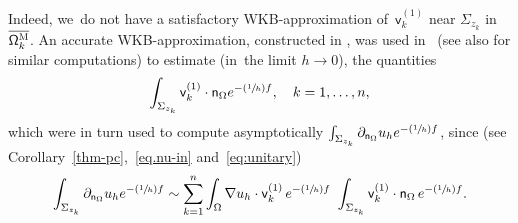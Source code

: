 \documentclass[10pt]{amsart}
\newcommand{\Psfrac}[2]{(\sfrac{#1}{#2})}
\theoremstyle{plain}
\theoremstyle{definition}
\begin{document}
Indeed, we~do not
have a
satisfactory
WKB-approximation of~$ \mathsf v_k^{(1)} $ near
$\Sigma_{z_k}$ in $\overline{\mathsf \Omega_k^{\textsc{M}}}$.
An accurate WKB-approximation, constructed in \cite{helffer-nier-06}, was used in~\cite{DLLN} (see also
\cite{DLLN-saddle1}
for similar computations) to estimate
(in~the limit $h \to 0$), the quantities
\begin{equation}\label{eq.int-bordvk}
\int_{\Sigma_{z_k}} \mathsf v_k^{(1)} \cdot \mathsf n_{\Omega} e^{-\Psfrac 1hf}, \quad k=1,\ldots,n,
\end{equation}
which were in turn used to compute asymptotically $\int_{\Sigma_{z_k}}\partial_{\mathsf n_\Omega}u_h e^{-\Psfrac 1hf}$, since (see Corollary~\ref{thm-pc},~\eqref{eq.nu-in} and~\eqref{eq:unitary})
\[
\int_{\Sigma_{z_k}}\partial_{\mathsf n_\Omega}u_h e^{-\Psfrac 1hf}\sim
\sum_{k=1}^n \int_\Omega \nabla u_h\cdot \mathsf v_k^{(1)} \,
e^{-\Psfrac 1hf}\ \int_{\Sigma_{z_k}} \mathsf v_k^{(1)} \cdot \mathsf
n_{\Omega} \, e^{-\Psfrac 1hf}.
\]
\end{document}
